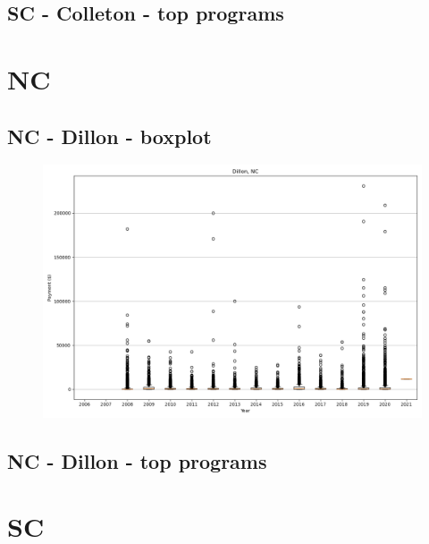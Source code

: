 \subsection*{SC - Colleton - top programs}

\newpage
\section*{NC}
\subsection*{NC - Dillon - boxplot}
\begin{figure}[h]
\centering
\includegraphics[width=7in]{../output/boxplots/counties/Dillon-NC_boxplot.png}
\end{figure}


\subsection*{NC - Dillon - top programs}

\newpage
\section*{SC}
